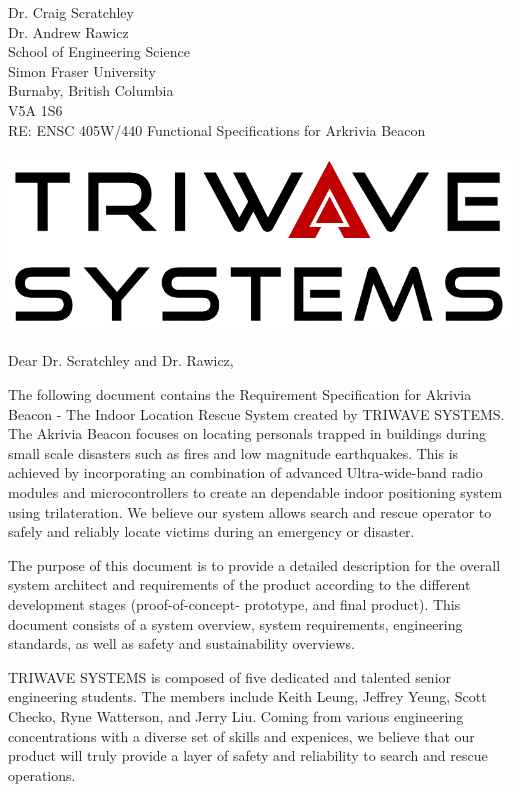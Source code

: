 \documentclass[11pt]{letter}
\date{June 09, 2019}
\begin{document}
\begin{letter}{
Dr. Craig Scratchley\\
Dr. Andrew Rawicz\\
School of Engineering Science\\
Simon Fraser University\\
Burnaby, British Columbia\\
V5A 1S6\\
\bigskip
RE: ENSC 405W/440 Functional Specifications for Arkrivia Beacon\\
} 


\begin{center}
\includegraphics[scale=0.25]{./images/logo_W.png}
\end{center}


\opening{Dear Dr. Scratchley and Dr. Rawicz,} 
 
\medskip
The following document contains the Requirement Specification for Akrivia Beacon - The Indoor Location Rescue System created by TRIWAVE SYSTEMS. The Akrivia Beacon focuses on locating personals trapped in buildings during small scale disasters such as fires and low magnitude earthquakes. This is achieved by incorporating an combination of advanced Ultra-wide-band radio modules and microcontrollers to create an dependable indoor positioning system using trilateration. We believe our system allows search and rescue operator to safely and reliably locate victims during an emergency or disaster.

\medskip
The purpose of this document is to provide a detailed description for the overall system architect and requirements of the product according to the different development stages (proof-of-concept- prototype, and final product). This document consists of a system overview, system requirements, engineering standards, as well as safety and sustainability overviews.

\medskip
TRIWAVE SYSTEMS is composed of five dedicated and talented senior engineering students. The members include Keith Leung, Jeffrey Yeung, Scott Checko, Ryne Watterson, and Jerry Liu. Coming from various engineering concentrations with a diverse set of skills and expenices, we believe that our product will truly provide a layer of safety and reliability to search and rescue operations.


\end{letter}
\end{document}

